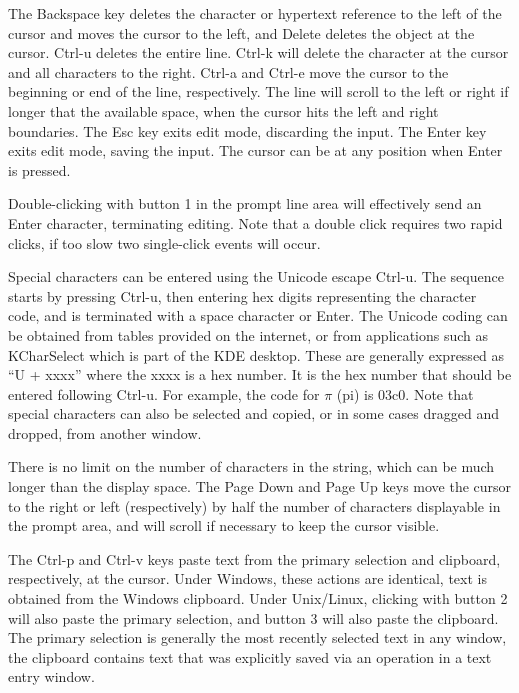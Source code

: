 The {\kb Backspace} key deletes the character or hypertext reference
to the left of the cursor and moves the cursor to the left, and {\kb
Delete} deletes the object at the cursor.  {\kb Ctrl-u} deletes the
entire line.  {\kb Ctrl-k} will delete the character at the cursor and
all characters to the right.  {\kb Ctrl-a} and {\kb Ctrl-e} move the
cursor to the beginning or end of the line, respectively.  The line
will scroll to the left or right if longer that the available space,
when the cursor hits the left and right boundaries.  The {\kb Esc} key
exits edit mode, discarding the input.  The {\kb Enter} key exits edit
mode, saving the input.  The cursor can be at any position when {\kb
Enter} is pressed.

Double-clicking with button 1 in the prompt line area will effectively
send an {\kb Enter} character, terminating editing.  Note that a
double click requires two rapid clicks, if too slow two single-click
events will occur. 

Special characters can be entered using the Unicode escape {\kb
Ctrl-u}.  The sequence starts by pressing {\kb Ctrl-u}, then entering
hex digits representing the character code, and is terminated with a
space character or {\kb Enter}.  The Unicode coding can be obtained
from tables provided on the internet, or from applications such as
KCharSelect which is part of the KDE desktop.  These are generally
expressed as ``{\vt U + xxxx}'' where the {\vt xxxx} is a hex number. 
It is the hex number that should be entered following {\kb Ctrl-u}. 
For example, the code for ${\pi}$ (pi) is {\vt 03c0}.  Note that
special characters can also be selected and copied, or in some cases
dragged and dropped, from another window.

There is no limit on the number of characters in the string, which
can be much longer than the display space.  The {\kb Page Down} and
{\kb Page Up} keys move the cursor to the right or left (respectively)
by half the number of characters displayable in the prompt area, and
will scroll if necessary to keep the cursor visible.

The {\kb Ctrl-p} and {\kb Ctrl-v} keys paste text from the primary
selection and clipboard, respectively, at the cursor.  Under Windows,
these actions are identical, text is obtained from the Windows
clipboard.  Under Unix/Linux, clicking with button 2 will also paste
the primary selection, and button 3 will also paste the clipboard. 
The primary selection is generally the most recently selected text in
any window, the clipboard contains text that was explicitly saved via
an operation in a text entry window.

